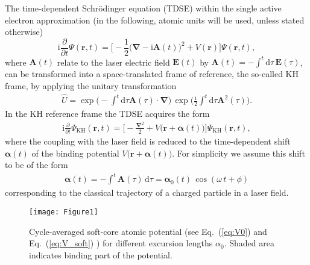 \documentclass[
pra%
,preprint%
,amssymb, nobibnotes, aps, superscriptaddress, floatfix]{revtex4}
\renewcommand{\imath}{\mathrm{i}}
\newcommand{\dd}{\mathrm{d}}
\newcommand{\rv}{\mathbf{r}}
\newcommand{\av}{\boldsymbol{\alpha}}
\newcommand{\as}{\alpha}
\newcommand{\khsub}{\mathrm{KH}}
\newcommand{\phase}{\phi}
\begin{document}
The time-dependent Schr\"{o}dinger equation (TDSE) within the single active electron approximation (in the following, atomic units will be used, unless stated otherwise)
\begin{equation}
\imath \frac{\partial}{\partial t}\Psi(\rv, t) = \Big[-\frac{1}{2} \big( \boldsymbol{\nabla} - \imath \mathbf{A}(t) \big)^2 + V(\rv) \Big] \Psi(\rv, t), \label{eq:tdse}
\end{equation}
where $\mathbf{A}(t)$ relate to the laser electric field $\mathbf{E}(t)$ by $\mathbf{A}(t) = -\int^t\mathrm{d}\tau \, \mathbf{E}(\tau)$, can be transformed into a space-translated frame of reference, the so-called KH frame, by applying the unitary transformation
\begin{align}
\hat{U} = \exp\Big( -\int^t \dd \tau \mathbf{A}(\tau) \cdot \boldsymbol{\nabla}  \Big) \,
\exp\Big( \frac{\imath}{2} \int^t \mathrm{d}\tau \mathbf{A}^2(\tau) \Big).
\end{align}
In the KH reference frame the TDSE acquires the form
\begin{align}
	\imath \frac{\partial}{\partial t} \Psi_{\khsub}(\rv, t) = \Big[-\frac{\boldsymbol{\nabla}^2}{2} + V\big(\rv + \av(t)\big) \Big] \Psi_{\khsub}(\rv, t), \label{eq:tdse_kh}
\end{align}
where the coupling with the laser field is reduced to the time-dependent shift $\av(t)$ of the binding potential $V\big(\rv + \av(t)\big)$. For simplicity we assume this shift to be of the form
	\begin{align}
	\av(t) = -\int^t \mathbf{A}(\tau) \, \mathrm{d}\tau = \av_0(t) \, \cos(\omega \, t + \phase)
	\label{eq:excursion}
	\end{align}
corresponding to the classical trajectory of a charged particle in a laser field. 


\begin{figure}
\centering
\texttt{[image: Figure1]}
\caption{Cycle-averaged soft-core atomic potential (see Eq.~(\ref{eq:V0}) and Eq.~(\ref{eq:V_soft}) ) for different excursion lengths $\as_0$. Shaded area indicates binding part of the potential.}
\label{fig:KH_potentials}
\end{figure}
\end{document}

